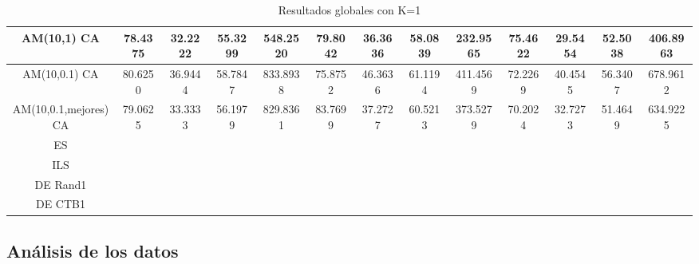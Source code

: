 \documentclass[12pt,a4paper]{article}
\begin{document}
\begin{table}[h!]
{\begin{tabular}{| c | c | c | c | c | c | c | c | c | c | c | c | c |}
				AM(10,1) CA & 78.4375 & 32.2222 & 55.3299 & 548.2520 & 79.8042 & 36.3636 & 58.0839 & 232.9565 & 75.4622 & 29.5454 & 52.5038 & 406.8963 \\ [0.5ex] \hline
				AM(10,0.1) CA & 80.6250 & 36.9444 & 58.7847 & 833.8938 & 75.8752 & 46.3636 & 61.1194 & 411.4569 & 72.2269 & 40.4545 & 56.3407 & 678.9612 \\ [0.5ex] \hline
				AM(10,0.1,mejores) CA & 79.0625 & 33.3333 & 56.1979 & 829.8361 & 83.7699 & 37.2727 & 60.5213 & 373.5279 & 70.2024 & 32.7273 & 51.4649 & 634.9225 \\ [0.5ex] \hline
				ES &  &  &  &  &  &  &  &  &  &  &  &  \\ [0.5ex] \hline
				ILS &  &  &  &  &  &  &  &  &  &  &  &  \\ [0.5ex] \hline
				DE Rand1 &  &  &  &  &  &  &  &  &  &  &  &  \\ [0.5ex] \hline
				DE CTB1 &  &  &  &  &  &  &  &  &  &  &  &  \\ [0.5ex] \hline
			\end{tabular}
		}
		\label{tablaGlobalK1}
		\caption{Resultados globales con K=1}
	\end{table}


	\newpage

	\subsection{Análisis de los datos}
\end{document}
